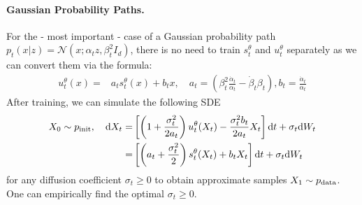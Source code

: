 \begin{summarybox}
\paragraph{Gaussian Probability Paths.} For the - most important -  case of a Gaussian probability path $p_t(x|z)=\mathcal{N}(x;\alpha_tz,\beta_t^2I_d)$, there is no need to train $s_t^\theta$ and $u_t^\theta$ separately as we can convert them via the formula:
\begin{align*}
u_t^\theta(x)=&a_t s_t^\theta(x)+b_tx,\quad a_t=\left(\beta_t^2\frac{\dot{\alpha}_t}{\alpha_t}-\dot{\beta}_t\beta_t\right), b_t=\frac{\dot{\alpha}_t}{\alpha_t}
\end{align*}
After training, we can simulate the following SDE
\begin{align}
X_0\sim p_{\rm{init}},\quad \mathrm{d} X_t =&\left[\left(1+\frac{\sigma_{t}^2}{2a_t}\right)u_t^\theta(X_t)-\frac{\sigma_{t}^2b_t}{2a_t}X_t\right]\mathrm{d} t +\sigma_t\mathrm{d} W_t\\
=&\left[\left(a_t+\frac{\sigma_{t}^2}{2}\right)s_t^\theta(X_t)+b_tX_t\right]\mathrm{d} t +\sigma_t\mathrm{d} W_t
\end{align}
for any diffusion coefficient $\sigma_{t}\geq 0$ 
to obtain approximate samples $X_1\sim p_{\rm{data}}$. One can empirically find the optimal $\sigma_t\geq 0$.
\end{summarybox}





